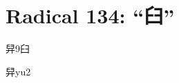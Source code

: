
\section*{Radical 134: ``⾅''}

\begin{entry}{舁}{9}{⾅}
  \begin{phonetics}{舁}{yu2}
  \end{phonetics}
\end{entry}


